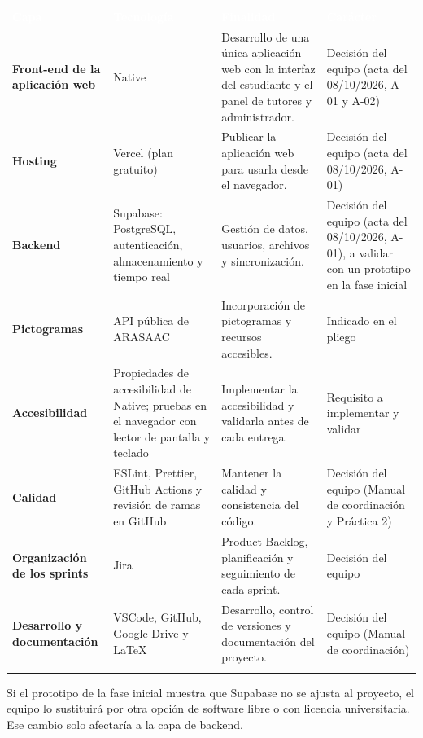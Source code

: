 \documentclass[11pt,a4paper]{article}
\newcommand{\hl}[1]{\textcolor{gblue}{\textbf{#1}}}
\begin{document}
\par\noindent\begin{tabular}{@{}>{\raggedright\arraybackslash}p{}>{\raggedright\arraybackslash}p{}>{\raggedright\arraybackslash}p{}>{\raggedright\arraybackslash}p{}@{}}
\rowcolor{gblue}\textcolor{white}{\textbf{Capa}} & \textcolor{white}{\textbf{Tecnología}} & \textcolor{white}{\textbf{Finalidad}} & \textcolor{white}{\textbf{Carácter}} \\
\hl{Front-end de la aplicación web} & Native & Desarrollo de una única aplicación web con la interfaz del estudiante y el panel de tutores y administrador. & Decisión del equipo (acta del 08/10/2026, A-01 y A-02) \\ \arrayrulecolor{gline}\hline
\rowcolor{glight}
\hl{Hosting} & Vercel (plan gratuito) & Publicar la aplicación web para usarla desde el navegador. & Decisión del equipo (acta del 08/10/2026, A-01) \\ \arrayrulecolor{gline}\hline
\hl{Backend} & Supabase: PostgreSQL, autenticación, almacenamiento y tiempo real & Gestión de datos, usuarios, archivos y sincronización. & Decisión del equipo (acta del 08/10/2026, A-01), a validar con un prototipo en la fase inicial \\ \arrayrulecolor{gline}\hline
\rowcolor{glight}
\hl{Pictogramas} & API pública de ARASAAC & Incorporación de pictogramas y recursos accesibles. & Indicado en el pliego \\ \arrayrulecolor{gline}\hline
\hl{Accesibilidad} & Propiedades de accesibilidad de Native; pruebas en el navegador con lector de pantalla y teclado & Implementar la accesibilidad y validarla antes de cada entrega. & Requisito a implementar y validar \\ \arrayrulecolor{gline}\hline
\rowcolor{glight}
\hl{Calidad} & ESLint, Prettier, GitHub Actions y revisión de ramas en GitHub & Mantener la calidad y consistencia del código. & Decisión del equipo (Manual de coordinación y Práctica 2) \\ \arrayrulecolor{gline}\hline
\hl{Organización de los sprints} & Jira & Product Backlog, planificación y seguimiento de cada sprint. & Decisión del equipo \\ \arrayrulecolor{gline}\hline
\rowcolor{glight}
\hl{Desarrollo y \mbox{documentación}} & VSCode, GitHub, Google Drive y LaTeX & Desarrollo, control de versiones y documentación del proyecto. & Decisión del equipo (Manual de coordinación) \\ \arrayrulecolor{gline}\hline
\end{tabular}\par\medskip
Si el prototipo de la fase inicial muestra que Supabase no se ajusta al proyecto, el equipo lo sustituirá por otra opción de software libre o con licencia universitaria. Ese cambio solo afectaría a la capa de backend.
\end{document}
